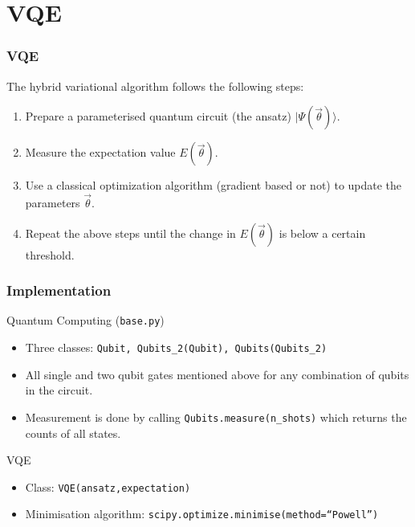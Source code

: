 \documentclass{beamer}
\begin{document}
\section{VQE}

\begin{frame}[t]
	\frametitle{VQE}
	The hybrid variational algorithm follows the following steps:
	\begin{enumerate}
	\item Prepare a parameterised quantum circuit (the ansatz) $|\Psi(\vec{\theta})\rangle$.
	\item Measure the expectation value $E(\vec{\theta})$.
	\item Use a classical optimization algorithm (gradient based or not) to update the parameters $\vec{\theta}$.
	\item Repeat the above steps until the change in $E(\vec{\theta})$ is below a certain threshold.	
	\end{enumerate}
\end{frame}

\begin{frame}[t]
	\frametitle{Implementation}
\begin{block}{Quantum Computing (\texttt{base.py})}
	\begin{itemize}
		\item Three classes: \texttt{Qubit, Qubits\_2(Qubit), Qubits(Qubits\_2)} 
		\item All single and two qubit gates mentioned above for any combination of qubits in the circuit.
		\item Measurement is done by calling \texttt{Qubits.measure(n\_shots)} which returns the counts of all states.
	\end{itemize}
\end{block}
	
\begin{block}{VQE}
	\begin{itemize}
		\item Class: \texttt{VQE(ansatz,expectation)}
		\item Minimisation algorithm: \texttt{scipy.optimize.minimise(method=``Powell'')}
	\end{itemize}

\end{block}
\end{frame}
\end{document}
